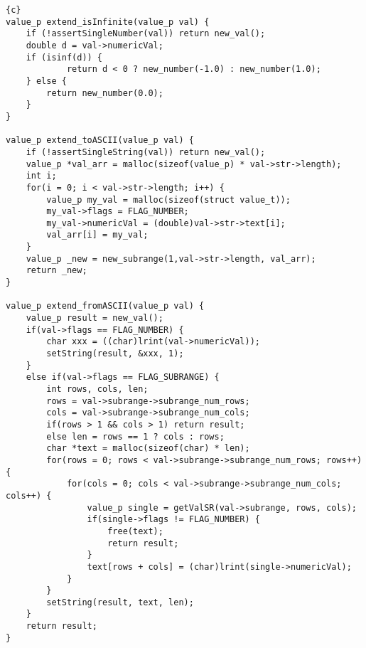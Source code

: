\begin{lstlisting}{c}
value_p extend_isInfinite(value_p val) {
	if (!assertSingleNumber(val)) return new_val();
	double d = val->numericVal;
	if (isinf(d)) {
			return d < 0 ? new_number(-1.0) : new_number(1.0);
	} else {
		return new_number(0.0);
	}
}

value_p extend_toASCII(value_p val) {
	if (!assertSingleString(val)) return new_val();
	value_p *val_arr = malloc(sizeof(value_p) * val->str->length);
	int i;
	for(i = 0; i < val->str->length; i++) {
		value_p my_val = malloc(sizeof(struct value_t));
		my_val->flags = FLAG_NUMBER;
		my_val->numericVal = (double)val->str->text[i];
		val_arr[i] = my_val;
	}
	value_p _new = new_subrange(1,val->str->length, val_arr);
	return _new;
}

value_p extend_fromASCII(value_p val) {
	value_p result = new_val();
	if(val->flags == FLAG_NUMBER) {
		char xxx = ((char)lrint(val->numericVal));
		setString(result, &xxx, 1);
	}
	else if(val->flags == FLAG_SUBRANGE) {
		int rows, cols, len;
		rows = val->subrange->subrange_num_rows;
		cols = val->subrange->subrange_num_cols;
		if(rows > 1 && cols > 1) return result;
		else len = rows == 1 ? cols : rows;
		char *text = malloc(sizeof(char) * len);
		for(rows = 0; rows < val->subrange->subrange_num_rows; rows++) {
			for(cols = 0; cols < val->subrange->subrange_num_cols; cols++) {
				value_p single = getValSR(val->subrange, rows, cols);
				if(single->flags != FLAG_NUMBER) {
					free(text);
					return result;
				}
				text[rows + cols] = (char)lrint(single->numericVal);
			}
		}
		setString(result, text, len);
	}
	return result;
}
\end{lstlisting}
